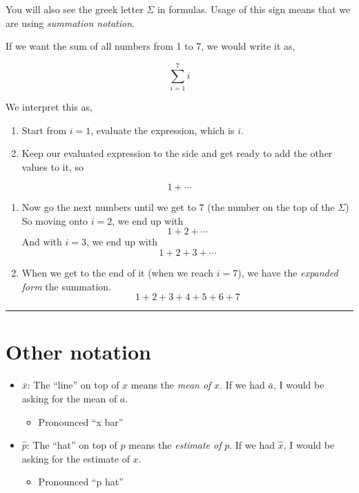 \documentclass[
]{book}
\providecommand{\tightlist}{%
  \setlength{\itemsep}{0pt}\setlength{\parskip}{0pt}}
\theoremstyle{definition}
\theoremstyle{definition}
\theoremstyle{definition}
\theoremstyle{definition}
\theoremstyle{remark}
\begin{document}
You will also see the greek letter \(\Sigma\) in formulas. Usage of this
sign means that we are using \emph{summation notation}.

If we want the sum of all numbers from 1 to 7, we would write it as,

\[\sum_{i=1}^7 i\]

We interpret this as,

\begin{enumerate}
\def\labelenumi{\arabic{enumi}.}
\item
  Start from \(i = 1\), evaluate the expression, which is \(i\).
\item
  Keep our evaluated expression to the side and get ready to add the
  other values to it, so
\end{enumerate}

\[1 + \cdots\]

\begin{enumerate}
\def\labelenumi{\arabic{enumi}.}
\setcounter{enumi}{2}
\item
  Now go the next numbers until we get to \(7\) (the number on the top
  of the \(\Sigma\)) So moving onto \(i = 2\), we end up with
  \[1 + 2 + \cdots\] \newline And with \(i = 3\), we end up with
  \[1 + 2 + 3 + \cdots\] \newline
\item
  When we get to the end of it (when we reach \(i = 7\)), we have the
  \emph{expanded form} the summation. \[1 + 2 + 3+ 4 + 5 + 6 + 7\]
\end{enumerate}

\begin{center}\rule{0.5\linewidth}{0.5pt}\end{center}

\hypertarget{other-notation}{%
\section{Other notation}\label{other-notation}}

\begin{itemize}
\tightlist
\item
  \(\bar x\): The ``line'' on top of \(x\) means the \emph{mean of} \(x\). If we
  had \(\bar a\), I would be asking for the mean of \(a\).

  \begin{itemize}
  \tightlist
  \item
    Pronounced ``x bar''
  \end{itemize}
\item
  \(\hat p\): The ``hat'' on top of \(p\) means the \emph{estimate of} \(p\). If we
  had \(\hat x\), I would be asking for the estimate of \(x\).

  \begin{itemize}
  \tightlist
  \item
    Pronounced ``p hat''
  \end{itemize}
\end{itemize}
\end{document}
